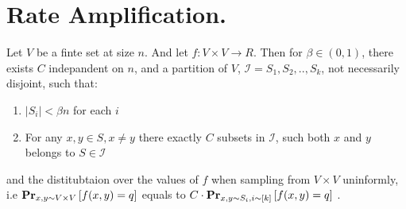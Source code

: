 \documentclass[manuscript,screen,review]{acmart}
\begin{document}
\section{Rate Amplification.}

\begin{claim}
  Let $V$ be a finte set at size $n$. And let $ f : V \times V \rightarrow R$. Then  for $\beta \in (0,1)$, there exists $C$ indepandent on $n$, and a partition of $V$, $\mathcal{I} = S_{1},S_{2},..,S_{k}$, not necessarily disjoint, such that: 
  \begin{enumerate}
    \item $|S_{i}| < \beta n$ for each $i$
    \item For any $x,y \in S, x\neq y$ there exactly $C$ subsets in $\mathcal{I}$, such both $x$ and $y$ belongs to $S \in \mathcal{I}$
  \end{enumerate}
   and the distitubtaion over the values of $f$ when sampling from $V \times V$ uninformly, i.e $\prbm{ f(x,y) = q  }{x,y \sim V \times V}$  equals to $C \cdot \prbm{f(x,y) = q }{x,y \sim S_{i}, i\sim [k]}$ .
\end{claim}


%
%
%
\end{document}
